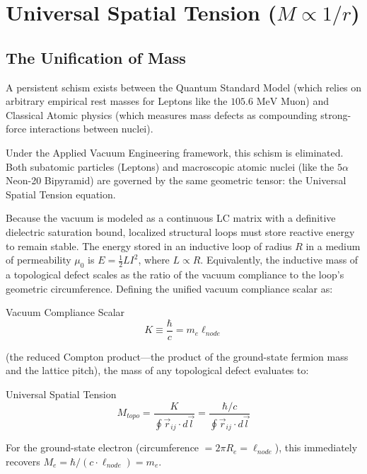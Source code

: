 \chapter{Universal Spatial Tension ($M \propto 1/r$)}
\label{ch:universal_spatial_tension}

\section{The Unification of Mass}
A persistent schism exists between the Quantum Standard Model (which relies on arbitrary empirical rest masses for Leptons like the $105.6 \text{ MeV}$ Muon) and Classical Atomic physics (which measures mass defects as compounding strong-force interactions between nuclei). 

Under the Applied Vacuum Engineering framework, this schism is eliminated. Both subatomic particles (Leptons) and macroscopic atomic nuclei (like the $5\alpha$ Neon-20 Bipyramid) are governed by the same geometric tensor: the Universal Spatial Tension equation. 

Because the vacuum is modeled as a continuous LC matrix with a definitive dielectric saturation bound, localized structural loops must store reactive energy to remain stable. The energy stored in an inductive loop of radius $R$ in a medium of permeability $\mu_0$ is $E = \frac{1}{2}L I^2$, where $L \propto R$. Equivalently, the inductive mass of a topological defect scales as the ratio of the vacuum compliance to the loop's geometric circumference. Defining the unified vacuum compliance scalar as:
\begin{resultbox}{Vacuum Compliance Scalar}
\begin{equation}
    K \equiv \frac{\hbar}{c} = m_e \ell_{node}
\end{equation}
\end{resultbox}
(the reduced Compton product---the product of the ground-state fermion mass and the lattice pitch), the mass of any topological defect evaluates to:
\begin{resultbox}{Universal Spatial Tension}
\begin{equation}
    M_{topo} = \frac{K}{\oint \vec{r}_{ij} \cdot d\vec{l}} = \frac{\hbar/c}{\oint \vec{r}_{ij} \cdot d\vec{l}}
\end{equation}
\end{resultbox}

For the ground-state electron (circumference $= 2\pi R_e = \ell_{node}$), this immediately recovers $M_e = \hbar/(c \cdot \ell_{node}) = m_e$.

